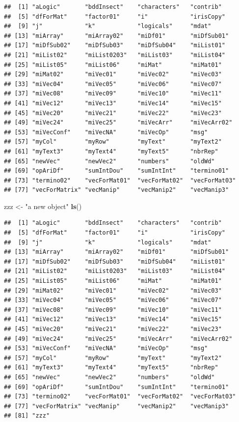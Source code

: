 \documentclass[]{book}
\newenvironment{Shaded}{\begin{snugshade}}{\end{snugshade}}
\newcommand{\KeywordTok}[1]{\textcolor[rgb]{0.13,0.29,0.53}{\textbf{#1}}}
\newcommand{\StringTok}[1]{\textcolor[rgb]{0.31,0.60,0.02}{#1}}
\newcommand{\NormalTok}[1]{#1}
\begin{document}
\begin{verbatim}
##  [1] "aLogic"       "bddInsect"    "characters"   "contrib"     
##  [5] "dfForMat"     "factor01"     "i"            "irisCopy"    
##  [9] "j"            "k"            "logicals"     "mdat"        
## [13] "miArray"      "miArray02"    "miDf01"       "miDfSub01"   
## [17] "miDfSub02"    "miDfSub03"    "miDfSub04"    "miList01"    
## [21] "miList02"     "miList0203"   "miList03"     "miList04"    
## [25] "miList05"     "miList06"     "miMat"        "miMat01"     
## [29] "miMat02"      "miVec01"      "miVec02"      "miVec03"     
## [33] "miVec04"      "miVec05"      "miVec06"      "miVec07"     
## [37] "miVec08"      "miVec09"      "miVec10"      "miVec11"     
## [41] "miVec12"      "miVec13"      "miVec14"      "miVec15"     
## [45] "miVec20"      "miVec21"      "miVec22"      "miVec23"     
## [49] "miVec24"      "miVec25"      "miVecArr"     "miVecArr02"  
## [53] "miVecConf"    "miVecNA"      "miVecOp"      "msg"         
## [57] "myCol"        "myRow"        "myText"       "myText2"     
## [61] "myText3"      "myText4"      "myText5"      "nbrRep"      
## [65] "newVec"       "newVec2"      "numbers"      "oldWd"       
## [69] "opAriDf"      "sumIntDou"    "sumIntInt"    "termino01"   
## [73] "termino02"    "vecForMat01"  "vecForMat02"  "vecForMat03" 
## [77] "vecForMatrix" "vecManip"     "vecManip2"    "vecManip3"
\end{verbatim}

\begin{Shaded}
\begin{Highlighting}[]
\NormalTok{zzz <-}\StringTok{ "a new object"}
\KeywordTok{ls}\NormalTok{()}
\end{Highlighting}
\end{Shaded}

\begin{verbatim}
##  [1] "aLogic"       "bddInsect"    "characters"   "contrib"     
##  [5] "dfForMat"     "factor01"     "i"            "irisCopy"    
##  [9] "j"            "k"            "logicals"     "mdat"        
## [13] "miArray"      "miArray02"    "miDf01"       "miDfSub01"   
## [17] "miDfSub02"    "miDfSub03"    "miDfSub04"    "miList01"    
## [21] "miList02"     "miList0203"   "miList03"     "miList04"    
## [25] "miList05"     "miList06"     "miMat"        "miMat01"     
## [29] "miMat02"      "miVec01"      "miVec02"      "miVec03"     
## [33] "miVec04"      "miVec05"      "miVec06"      "miVec07"     
## [37] "miVec08"      "miVec09"      "miVec10"      "miVec11"     
## [41] "miVec12"      "miVec13"      "miVec14"      "miVec15"     
## [45] "miVec20"      "miVec21"      "miVec22"      "miVec23"     
## [49] "miVec24"      "miVec25"      "miVecArr"     "miVecArr02"  
## [53] "miVecConf"    "miVecNA"      "miVecOp"      "msg"         
## [57] "myCol"        "myRow"        "myText"       "myText2"     
## [61] "myText3"      "myText4"      "myText5"      "nbrRep"      
## [65] "newVec"       "newVec2"      "numbers"      "oldWd"       
## [69] "opAriDf"      "sumIntDou"    "sumIntInt"    "termino01"   
## [73] "termino02"    "vecForMat01"  "vecForMat02"  "vecForMat03" 
## [77] "vecForMatrix" "vecManip"     "vecManip2"    "vecManip3"   
## [81] "zzz"
\end{verbatim}
\end{document}
